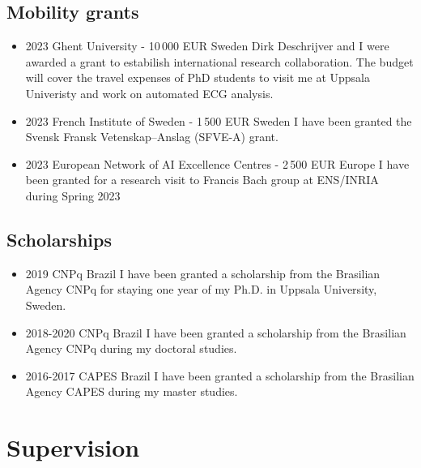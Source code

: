 \documentclass[10pt,A4]{article} %
\begin{document}
\subsection{Mobility grants}
\begin{itemize}
    \item {}
    { 2023 }
    { Ghent University - 10\,000 EUR }
    { Sweden }
    { Dirk Deschrijver and I were awarded a grant to estabilish international research collaboration. The budget will cover the travel expenses of PhD students to visit me at Uppsala Univeristy and work on automated ECG analysis. }
    \item {}
    { 2023 }
    { French Institute of Sweden - 1\,500 EUR }
    { Sweden }
    { I have been granted the Svensk Fransk Vetenskap–Anslag (SFVE-A) grant. }
   \item  {}
    { 2023 }
    { European Network of AI Excellence Centres - 2\,500 EUR}
    { Europe }
    { I have been granted for a research visit to Francis Bach group at ENS/INRIA during Spring 2023 }
  \end{itemize}

\subsection{Scholarships}
 \begin{itemize}
    \item   {}
    { 2019 }
    { CNPq }
    { Brazil }
    { I have been granted a scholarship from the Brasilian Agency CNPq for staying one year of my Ph.D. in Uppsala University, Sweden. }
    \item {}
    { 2018-2020 }
    { CNPq }
    { Brazil }
    { I have been granted a scholarship from the Brasilian Agency CNPq during my doctoral studies. }
    \item {}
    { 2016-2017 }
    { CAPES }
    { Brazil }
    { I have been granted a scholarship from the Brasilian Agency CAPES during my master studies. }

  \end{itemize}


\section{Supervision}
\end{document}
